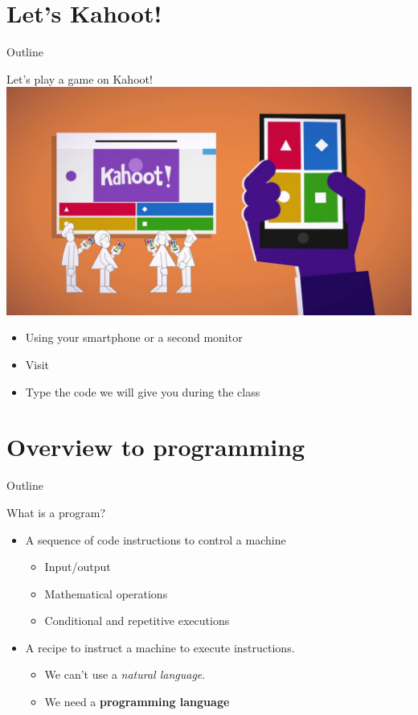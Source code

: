 \documentclass{beamer}%
\begin{document}
\section{Let's Kahoot!}
\begin{frame}{Outline}
	\tableofcontents[currentsection]
\end{frame}

\begin{frame}{Let's play a game on Kahoot!}
	\centering
\includegraphics[width=0.8\linewidth]{figures/kahoot.jpg}
	\begin{itemize}	
	\item Using your smartphone or a second monitor
	\item Visit	
	\item Type the code we will give you during the class
	\end{itemize}
\end{frame}

\section{Overview to programming}
\begin{frame}{Outline}
	\tableofcontents[currentsection]
\end{frame}


\begin{frame}{What is a program?}
	\begin{itemize}
		\item A sequence of code instructions to control a machine
		\begin{itemize}
			\item Input/output
			\item Mathematical operations
			\item Conditional and repetitive executions
		\end{itemize}
		\item A recipe to instruct a machine to execute instructions. 
		\begin{itemize}
			\item We can't use a \emph{natural language}. 
			\item We need a \textbf{programming language}
		\end{itemize}
	\end{itemize}
\end{frame}
\end{document}
